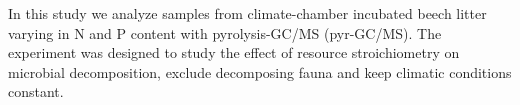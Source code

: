 \documentclass[authoryear,preprint,review,12pt]{elsarticle}
\begin{document}
                                                                                                                                                                                                                                                                                                                                                                                                                                                                                                                                                                                                                                                                                                                                                                                                                                                                                                                                                                                                                                                                                                                                                                                                                                                                                                                                                                                                                                                                                                                                        In this study we analyze samples from climate-chamber incubated beech litter varying in N and P content with pyrolysis-GC/MS (pyr-GC/MS). The experiment was designed to study the effect of resource stroichiometry on microbial decomposition, exclude decomposing fauna and keep climatic conditions constant.
\end{document}
